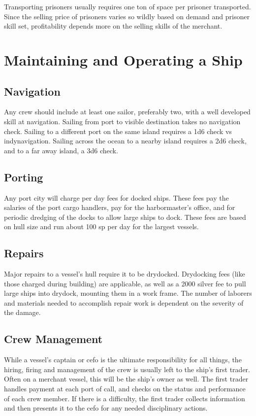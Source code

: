 Transporting prisoners usually requires one ton of space per prisoner transported. Since the selling price of prisoners varies so wildly based on demand and prisoner skill set, profitability depends more on the selling skills of the merchant.
\section{Maintaining and Operating a Ship}
\subsection{Navigation}
Any crew should include at least one sailor, preferably two, with a well developed skill at navigation. Sailing from port to visible destination takes no navigation check. Sailing to a different port on the same island requires a 1d6 check vs indy{navigation}. Sailing across the ocean to a nearby island requires a 2d6 check, and to a far away island, a 3d6 check.
\subsection{Porting}
Any port city will charge per day fees for docked ships. These fees pay the salaries of the port cargo handlers, pay for the harbormaster's office, and for periodic dredging of the docks to allow large ships to dock. These fees are based on hull size and run about 100 sp per day for the largest vessels.
\subsection{Repairs}
Major repairs to a vessel's hull require it to be drydocked. Drydocking fees (like those charged during building) are applicable, as well as a 2000 silver fee to pull large ships into drydock, mounting them in a work frame. The number of laborers and materials needed to accomplish repair work is dependent on the severity of the damage.
\subsection{Crew Management}
While a vessel's captain or cefo is the ultimate responsibility for all things, the hiring, firing and management of the crew is usually left to the ship's first trader. Often on a merchant vessel, this will be the ship's owner as well. The first trader handles payment at each port of call, and checks on the status and performance of each crew member. If there is a difficulty, the first trader collects information and then presents it to the cefo for any needed disciplinary actions.
